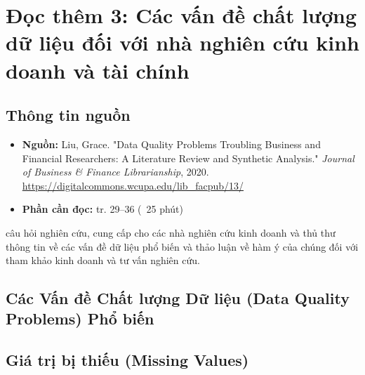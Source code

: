 \chapter{Đọc thêm 3: Các vấn đề chất lượng dữ liệu đối với nhà nghiên cứu kinh doanh và tài chính}
\label{ch:M2L4-reading3}


\section{Thông tin nguồn}

\begin{itemize}
  \item \textbf{Nguồn:} Liu, Grace. "Data Quality Problems Troubling Business and Financial Researchers: A Literature Review and Synthetic Analysis." \emph{Journal of Business \& Finance Librarianship}, 2020. \url{https://digitalcommons.wcupa.edu/lib_facpub/13/}
  \item \textbf{Phần cần đọc:} tr. 29--36 (~25 phút)
\end{itemize}

câu hỏi nghiên cứu, cung cấp cho các nhà nghiên cứu kinh doanh và thủ thư thông tin về các vấn đề dữ liệu phổ biến và thảo luận về hàm ý của chúng đối với tham khảo kinh doanh và tư vấn nghiên cứu.

\section{Các Vấn đề Chất lượng Dữ liệu (Data Quality Problems) Phổ biến}

\section{Giá trị bị thiếu (Missing Values)}

